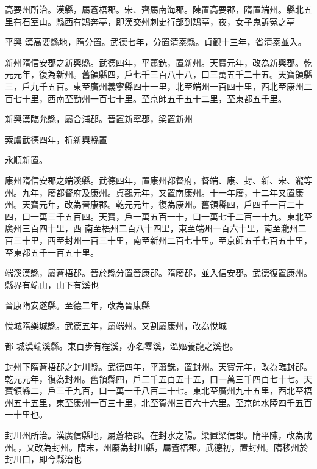 \begin{pinyinscope}
 高要州所治。漢縣，屬蒼梧郡。宋、齊屬南海郡。陳置高要郡，隋置端州。縣北五里有石室山。縣西有鵠奔亭，即漢交州刺史行部到鵠亭，夜，女子鬼訴冤之亭



 平興
 漢高要縣地，隋分置。武德七年，分置清泰縣。貞觀十三年，省清泰並入。



 新州隋信安郡之新興縣。武德四年，平蕭銑，置新州。天寶元年，改為新興郡。乾元元年，復為新州。舊領縣四，戶七千三百八十八，口三萬五千二十五。天寶領縣三，戶九千五百。東至廣州義寧縣四十一里，北至端州一百四十里，西北至康州二百七十里，西南至勤州一百七十里。至京師五千五十二里，至東都五千里。



 新興漢臨允縣，屬合浦郡。晉置新寧郡，梁置新州



 索盧武德四年，析新興縣置



 永順新置。



 康州隋信安郡之端溪縣。武德四年，置康州都督府，督端、康、封、新、宋、瀧等州。九年，廢都督府及康州。貞觀元年，又置南康州。十一年廢，十二年又置康州。天寶元年，改為晉康郡。乾元元年，復為康州。舊領縣四，戶四千一百二十四，口一萬三千五百四。天寶，戶一萬五百一十，口一萬七千二百一十九。東北至廣州三百四十里，西
 南至梧州二百八十四里，東至端州一百六十里，南至瀧州二百三十里，西至封州一百三十里，南至新州二百七十里。至京師五千七百五十里，至東都五千一百五十里。



 端溪漢縣，屬蒼梧郡。晉於縣分置晉康郡。隋廢郡，並入信安郡。武德復置康州。縣界有端山，山下有溪也



 晉康隋安遂縣。至德二年，改為晉康縣



 悅城隋樂城縣。武德五年，屬端州。又割屬康州，改為悅城



 都
 城漢端溪縣。東百步有程溪，亦名零溪，溫嫗養龍之溪也。



 封州下隋蒼梧郡之封川縣。武德四年，平蕭銑，置封州。天寶元年，改為臨封郡。乾元元年，復為封州。舊領縣四，戶二千五百五十五，口一萬三千四百七十七。天寶領縣二，戶三千九百，口一萬一千八百二十七。東北至廣州九十五里，西北至梧州五十五里，東至康州一百三十里，北至賀州三百六十六里。至京師水陸四千五百
 一十里也。



 封川州所治。漢廣信縣地，屬蒼梧郡。在封水之陽。梁置梁信郡。隋平陳，改為成州。，又改為封州。隋末，州廢為封川縣，屬蒼梧郡。武德初，置封州。隋移州於封川口，即今縣治也




\end{pinyinscope}
